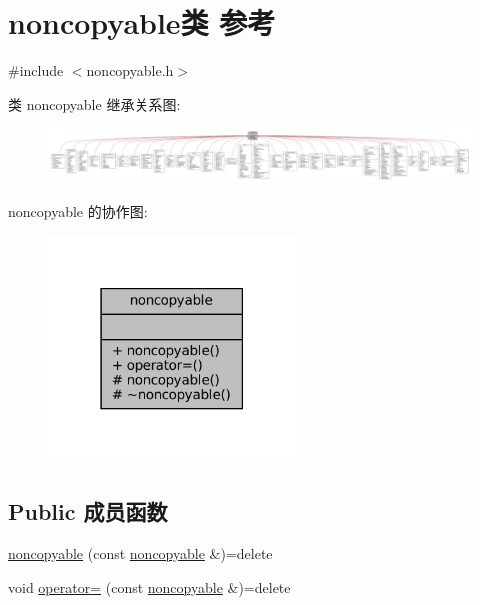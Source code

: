 \hypertarget{classmuduo_1_1noncopyable}{}\section{noncopyable类 参考}
\label{classmuduo_1_1noncopyable}


{\ttfamily \#include $<$noncopyable.\+h$>$}



类 noncopyable 继承关系图\+:
\nopagebreak
\begin{figure}[H]
\begin{center}
\leavevmode
\includegraphics[width=350pt]{classmuduo_1_1noncopyable__inherit__graph}
\end{center}
\end{figure}


noncopyable 的协作图\+:
\nopagebreak
\begin{figure}[H]
\begin{center}
\leavevmode
\includegraphics[width=186pt]{classmuduo_1_1noncopyable__coll__graph}
\end{center}
\end{figure}
\subsection*{Public 成员函数}
\begin{DoxyCompactItemize}
\item 
\hyperlink{classmuduo_1_1noncopyable_aaefac0158453c4de9989d742a02fdc61}{noncopyable} (const \hyperlink{classmuduo_1_1noncopyable}{noncopyable} \&)=delete
\item 
void \hyperlink{classmuduo_1_1noncopyable_adfca16bbe6126971c0c9959e573df923}{operator=} (const \hyperlink{classmuduo_1_1noncopyable}{noncopyable} \&)=delete
\end{DoxyCompactItemize}
